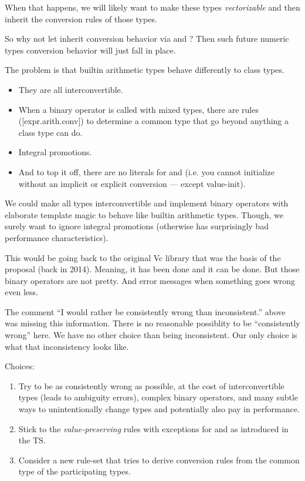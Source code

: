 When that happens, we will likely want to make these types \emph{vectorizable}
and then inherit the conversion rules of those types.

So why not let  inherit conversion behavior via
\std{} and \std{}?
Then such future numeric types conversion behavior will just fall in place.

The problem is that builtin arithmetic types behave differently to class types.
\begin{itemize}
  \item They are all interconvertible.
  \item When a binary operator is called with mixed types, there are rules
    ([expr.arith.conv]) to determine a common type that go beyond anything a
    class type can do.
  \item Integral promotions.
  \item And to top it off, there are no literals for  and
     (i.e. you cannot initialize without an implicit or
    explicit conversion --- except value-init).
\end{itemize}

We could make all  types interconvertible and implement binary
operators with elaborate template magic to behave like builtin arithmetic
types.
Though, we surely want to ignore integral promotions (otherwise
 has surprisingly bad performance
characteristics).

This would be going back to the original Vc library that was the basis of the
 proposal (back in 2014).
Meaning, it has been done and it can be done.
But those binary operators are not pretty.
And error messages when something goes wrong even less.

The comment ``I would rather be consistently wrong than inconsistent.'' above was missing this information.
There is no reasonable possiblity to be ``consistently wrong'' here.
We have no other choice than being inconsistent.
Our only choice is what that inconsistency looks like.

Choices:
\begin{enumerate}
  \item Try to be as consistently wrong as possible, at the cost of
    interconvertible types (leads to ambiguity errors), complex binary
    operators, and many subtle ways to unintentionally change types and
    potentially also pay in performance.

  \item\label{enum:valuepreserving} Stick to the \emph{value-preserving} rules with exceptions for
     and  as introduced in the TS.

  \item\label{enum:commontype} Consider a new rule-set that tries to derive conversion rules from the
    common type of the participating types.
\end{enumerate}

